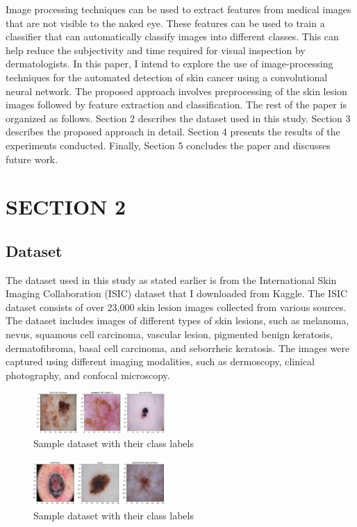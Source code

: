 \documentclass[twocolumn]{article}
\begin{document}
Image processing techniques can be used to extract features from medical images that are not visible to the naked eye. These features can be used to train a classifier that can automatically classify images into different classes. This can help reduce the subjectivity and time required for visual inspection by dermatologists.
In this paper, I intend to explore the use of image-processing techniques for the automated detection of skin cancer using a convolutional neural network. The proposed approach involves preprocessing of the skin lesion images followed by feature extraction and classification. The rest of the paper is organized as follows.  Section 2 describes the dataset used in this study. Section 3 describes the proposed approach in detail. Section 4 presents the results of the experiments conducted. Finally, Section 5 concludes the paper and discusses future work.

\section{SECTION 2}
\subsection{Dataset}
The dataset used in this study as stated earlier is from the International Skin Imaging Collaboration (ISIC) dataset that I downloaded from Kaggle. The ISIC dataset consists of over 23,000 skin lesion images collected from various sources. The dataset includes images of different types of skin lesions, such as melanoma, nevus, squamous cell carcinoma, vascular lesion, pigmented benign keratosis, dermatofibroma, basal cell carcinoma, and seborrheic keratosis. The images were captured using different imaging modalities, such as dermoscopy, clinical photography, and confocal microscopy.

\begin{figure}[H]
  \centering
  \includegraphics[width=0.45\textwidth]{derry.png}
  \caption{Sample dataset with their class labels}
  \label{fig: Sample dataset}
\end{figure}

\begin{figure}[H]
  \centering
  \includegraphics[width=0.45\textwidth]{dataset.jpg}
  \caption{Sample dataset with their class labels}
  \label{fig: Sample dataset}
\end{figure}
\end{document}
